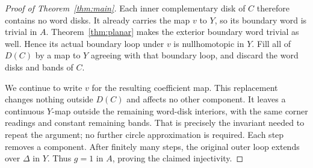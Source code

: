 \begin{proof}[Proof of Theorem~\ref{thm:main}]
Each inner complementary disk of $C$ therefore contains no word disks.
It already carries the map $v$ to $Y$, so its boundary word is trivial in
$A$. Theorem~\ref{thm:planar} makes the exterior boundary word trivial
as well. Hence its actual boundary loop under $v$ is nullhomotopic in
$Y$. Fill all of $D(C)$ by a map to $Y$ agreeing with that boundary loop,
and discard the word disks and bands of $C$.

We continue to write $v$ for the resulting coefficient map.
This replacement changes nothing outside $D(C)$ and affects no other
component. It leaves a continuous $Y$-map outside the remaining word-disk
interiors, with the same corner readings and constant remaining bands.
That is precisely the invariant needed to repeat the argument; no further
circle approximation is required. Each step removes a component. After
finitely many steps, the original outer loop extends over $\Delta$ in
$Y$. Thus $g=1$ in $A$, proving the claimed injectivity.
\end{proof}
